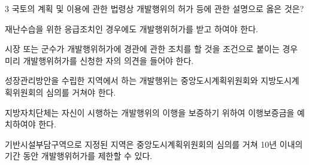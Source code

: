 \begin{question}{3}
국토의 계획 및 이용에 관한 법령상 개발행위의 허가 등에 관한 설명으로 옳은 것은?
\begin{choices}
  \item 재난수습을 위한 응급조치인 경우에도 개발행위허가를 받고 하여야 한다.
  \item 시장 또는 군수가 개발행위허가에 경관에 관한 조치를 할 것을 조건으로 붙이는 경우 미리 개발행위허가를 신청한 자의 의견을 들어야 한다.
  \item 성장관리방안을 수립한 지역에서 하는 개발행위는 중앙도시계획위원회와 지방도시계획위원회의 심의를 거쳐야 한다.
  \item 지방자치단체는 자신이 시행하는 개발행위의 이행을 보증하기 위하여 이행보증금을 예치하여야 한다.
  \item 기반시설부담구역으로 지정된 지역은 중앙도시계획위원회의 심의를 거쳐 10년 이내의 기간 동안 개발행위허가를 제한할 수 있다.
\end{choices}
\end{question}
